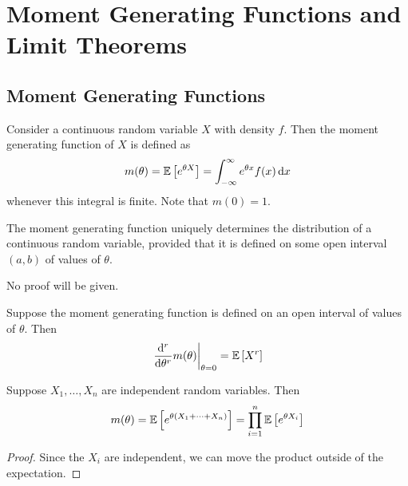 \documentclass{article}
\begin{document}
\section{Moment Generating Functions and Limit Theorems}
\subsection{Moment Generating Functions}
Consider a continuous random variable $X$ with density $f$. Then the moment generating function of $X$ is defined as
\[ m(\theta) = \mathbb{E}\left[{e^{\theta X}}\right] = \int_{-\infty}^\infty e^{\theta x} f(x) \dd{x} \]
whenever this integral is finite. Note that $m(0) = 1$.
\begin{theorem}
    The moment generating function uniquely determines the distribution of a continuous random variable, provided that it is defined on some open interval $(a, b)$ of values of $\theta$.
\end{theorem}
\noindent No proof will be given.
\begin{theorem}
    Suppose the moment generating function is defined on an open interval of values of $\theta$. Then
    \[ \eval{\dv[r]{\theta}m(\theta)}_{\theta = 0} = \expect{X^r} \]
\end{theorem}
\begin{theorem}
    Suppose $X_1, \dots, X_n$ are independent random variables. Then
    \[ m(\theta) = \mathbb{E}\left[{e^{\theta(X_1 + \dots + X_n)}}\right] = \prod_{i=1}^n \mathbb{E}\left[{e^{\theta X_i}}\right] \]
\end{theorem}
\begin{proof}
    Since the $X_i$ are independent, we can move the product outside of the expectation.
\end{proof}
\end{document}
